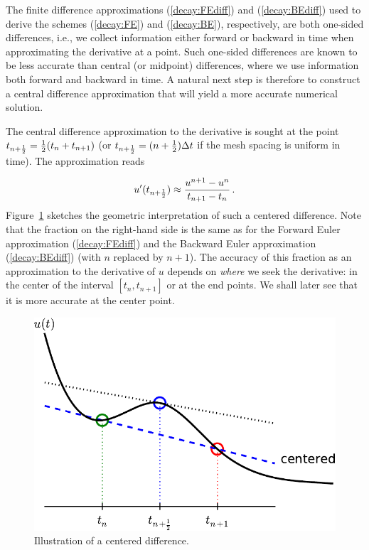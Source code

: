 \documentclass[%
oneside,                 %
final,                   %
10pt]{article}
\begin{document}
The finite difference approximations
(\ref{decay:FEdiff}) and (\ref{decay:BEdiff}) used to derive the schemes
(\ref{decay:FE}) and (\ref{decay:BE}), respectively,
are both one-sided differences, i.e.,
we collect information either forward or backward in time when approximating
the derivative at a point. Such one-sided differences are
known to be less accurate than central (or midpoint)
differences, where we use information both forward and backward in
time. A natural next step is therefore to construct
a central difference approximation that will yield a more accurate
numerical solution.

The central difference approximation to the derivative is sought at the
point $t_{n+\frac{1}{2}}=\frac{1}{2} (t_n + t_{n+1})$ (or
$t_{n+\frac{1}{2}}=(n+\frac{1}{2})\Delta t$ if the mesh spacing is uniform in time).
The approximation reads

\begin{equation}
u^{\prime}(t_{n+\frac{1}{2}}) \approx \frac{u^{n+1}-u^n}{t_{n+1}-t_n}\thinspace .
\label{decay:CNdiff}
\end{equation}
Figure~\ref{decay:sketch:CN} sketches the geometric interpretation of
such a centered difference.
Note that the fraction on the right-hand side is the same as for the
Forward Euler approximation (\ref{decay:FEdiff}) and
the Backward Euler approximation (\ref{decay:BEdiff}) (with
$n$ replaced by $n+1$). The accuracy of this fraction as an approximation
to the derivative of $u$ depends on \emph{where} we seek the derivative:
in the center of the interval $[t_{n},t_{n+1}]$ or at the end points.
We shall later see that it is more accurate at the center point.


\begin{figure}[!ht]  %
  \centerline{\includegraphics[width=0.8\linewidth]{fig-alg/fd_centered_CN.pdf}}
  \caption{
  Illustration of a centered difference. \label{decay:sketch:CN}
  }
\end{figure}
\end{document}
